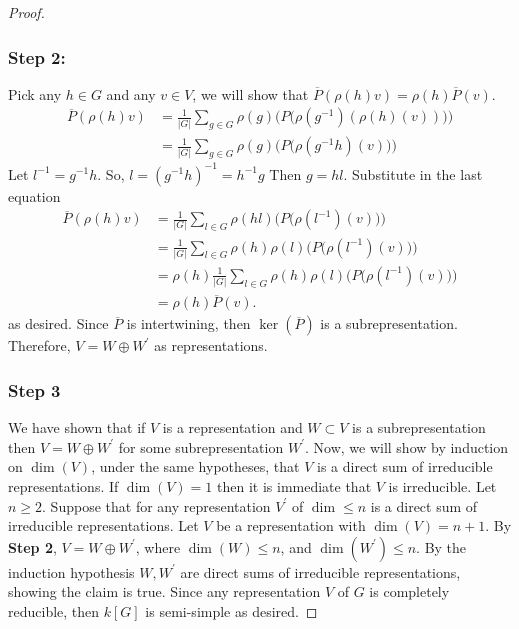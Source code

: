 \begin{proof}
   \subsubsection*{Step 2: } 
Pick any $h \in G$ and any $v \in V$, we will show that $\overline{P}(\rho(h)v) = \rho(h) \overline{P}(v)$.
\begin{align*}
    \overline{P}(\rho(h) v) &= \frac{1}{|G|} \sum_{g \in G} \rho(g)\big( P \big(\rho(g^{-1})( \rho(h)(v))\big)\big) \\
                            &= \frac{1}{|G|} \sum_{g \in G} \rho(g)\big( P \big(   \rho(g^{-1} h)(v)  \big) \big)
\end{align*}
Let $l^{-1} = g^{-1} h$. So, $l = (g^{-1} h)^{-1} = h^{-1} g$ Then $g = hl$. Substitute in the last equation
\begin{align*}
    \overline{P}(\rho(h) v) &= \frac{1}{|G|} \sum_{l \in G} \rho(hl)\big( P \big(   \rho(l^{-1})(v)  \big) \big) \\
                            &= \frac{1}{|G|} \sum_{l \in G} \rho(h) \rho(l)\big( P \big(   \rho(l^{-1})(v)  \big) \big) \\
                            &= \rho(h) \frac{1}{|G|} \sum_{l \in G} \rho(h) \rho(l)\big( P \big(   \rho(l^{-1})(v)  \big) \big) \\
                            &= \rho(h) \overline{P}(v).
                        \end{align*}                
                        as desired. Since $\overline{P}$ is intertwining, then $\ker(\overline{P})$ is a subrepresentation. Therefore, $V = W \oplus W^\prime$ as representations.
    \subsubsection*{Step 3}
    We have shown that if $V$ is a representation and $W \subset V$ is a subrepresentation then $V = W \oplus W^\prime$ for some subrepresentation $W^\prime$. Now, we will show by induction on $\dim(V)$, under the same hypotheses, that $V$ is a direct sum of irreducible representations.
    If $\dim(V)= 1$ then it is immediate that $V$ is irreducible. Let $n \geq 2$. Suppose that for any representation $V^\prime$ of $\dim \leq n$ is a direct sum of irreducible representations. Let $V$ be a representation with $\dim(V) = n +1$. By \textbf{Step 2}, $V = W \oplus W^\prime$, where $\dim(W) \leq n$, and $\dim(W^\prime) \leq n$. By the induction hypothesis $W,W^\prime$ are direct sums of irreducible representations, showing the claim is true.
    Since any representation $V$ of $G$ is completely reducible, then $k[G]$ is semi-simple as desired.             
\end{proof}


